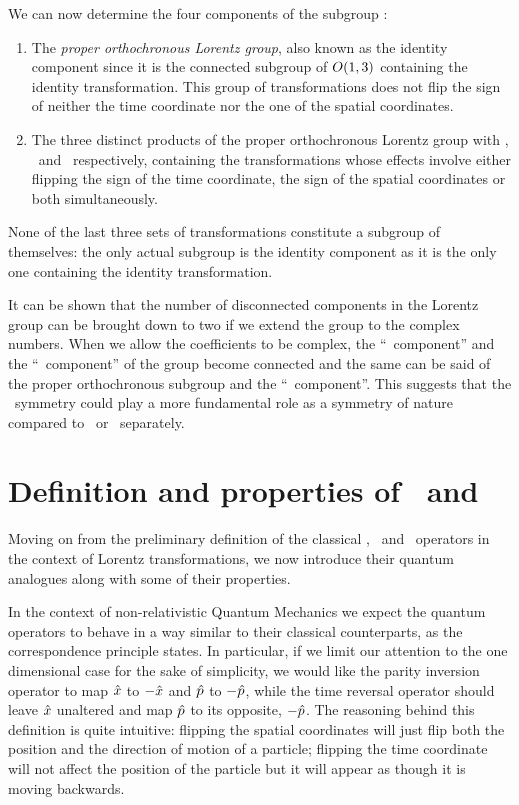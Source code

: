         We can now determine the four components of the subgroup \cite{bender2024}:
        \begin{enumerate}[label = \mybullet]
            \item The \emph{proper orthochronous Lorentz group}, also known as the identity component since it is the connected subgroup of $O\pqty{1,3}$ containing the identity transformation. This group of transformations does not flip the sign of neither the time coordinate nor the one of the spatial coordinates.
            \item The three distinct products of the proper orthochronous Lorentz group with \mcP, \mcT\ and \PT\ respectively, containing the transformations whose effects involve either flipping the sign of the time coordinate, the sign of the spatial coordinates or both simultaneously.
        \end{enumerate}
        None of the last three sets of transformations constitute a subgroup of themselves: the only actual subgroup is the identity component as it is the only one containing the identity transformation.
        
        It can be shown \cite{bender2024} that the number of disconnected components in the Lorentz group can be brought down to two if we extend the group to the complex numbers. When we allow the coefficients to be complex, the ``\mcP\ component'' and the ``\mcT\ component'' of the group become connected and the same can be said of the proper orthochronous subgroup and the ``\PT\ component''. This suggests that the \PT\ symmetry could play a more fundamental role as a symmetry of nature compared to \mcP\ or \mcT\ separately.
    
    \section{Definition and properties of \hP\ and \hT}\label{s:def-of-P-and-T}
        Moving on from the preliminary definition of the classical \mcP, \mcT\ and \PT\ operators in the context of Lorentz transformations, we now introduce their quantum analogues along with some of their properties.

        In the context of non-relativistic Quantum Mechanics we expect the quantum operators to behave in a way similar to their classical counterparts, as the correspondence principle states. In particular, if we limit our attention to the one dimensional case for the sake of simplicity, we would like the parity inversion operator to map $\hat{x}$ to $-\hat{x}$ and $\hat{p}$ to $-\hat{p}$, while the time reversal operator should leave $\hat{x}$ unaltered and map $\hat{p}$ to its opposite, $-\hat{p}$. The reasoning behind this definition is quite intuitive: flipping the spatial coordinates will just flip both the position and the direction of motion of a particle; flipping the time coordinate will not affect the position of the particle but it will appear as though it is moving backwards.


